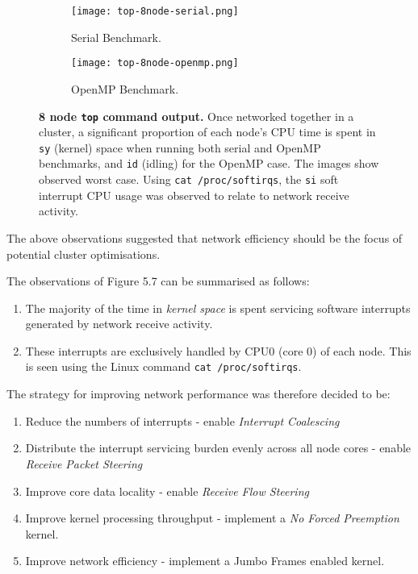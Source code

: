 \begin{figure}[]
	\begin{subfigure}{1.0\textwidth}
		\centering
		\texttt{[image: top-8node-serial.png]}
		\caption{Serial Benchmark.}
		\label{fig:subim2}
	\end{subfigure}
	\par\bigskip
	\begin{subfigure}{1.0\textwidth}
		\centering
		\texttt{[image: top-8node-openmp.png]}
		\caption{OpenMP Benchmark.}
		\label{fig:subim2}
	\end{subfigure}
\caption{\textbf{8 node \texttt{top} command output.} Once networked together in a cluster, a significant proportion of each node's CPU time is spent in \texttt{sy} (kernel) space when running both serial and OpenMP benchmarks, and \texttt{id} (idling) for the OpenMP case. The images show observed worst case. Using \texttt{cat /proc/softirqs}, the \texttt{si} soft interrupt CPU usage was observed to relate to network receive activity.} 
\label{fig:image2}
\end{figure}

The above observations suggested that network efficiency should be the focus of potential cluster optimisations.

The observations of Figure 5.7 can be summarised as follows:

\begin{enumerate}
\item The majority of the time in \emph{kernel space} is spent servicing software interrupts generated by network receive activity.
\item These interrupts are exclusively handled by CPU0 (core 0) of each node. This is seen using the Linux command \texttt{cat /proc/softirqs}.
\end{enumerate}

The strategy for improving network performance was therefore decided to be:

\begin{enumerate}
\item Reduce the numbers of interrupts - enable \emph{Interrupt Coalescing}
\item Distribute the interrupt servicing burden evenly across all node cores - enable \emph{Receive Packet Steering}
\item Improve core data locality - enable \emph{Receive Flow Steering}
\item Improve kernel processing throughput - implement a \emph{No Forced Preemption} kernel.
\item Improve network efficiency - implement a Jumbo Frames enabled kernel.
\end{enumerate}

